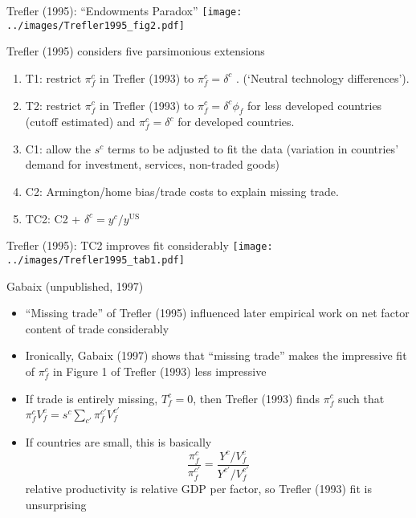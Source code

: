 \documentclass[10pt,notes=hide]{beamer}
\begin{document}
\begin{frame}{Trefler (1995): ``Endowments Paradox''}
\texttt{[image: ../images/Trefler1995\_fig2.pdf]}
\end{frame}
\begin{frame}{}
Trefler (1995) considers five parsimonious extensions
\begin{enumerate}
	\item T1: restrict $\pi_f^c$ in Trefler (1993) to $\pi_f^c = \delta^c$ . (`Neutral technology differences').
	\item T2: restrict $\pi_f^c$ in Trefler (1993) to $\pi_f^c = \delta^c \phi_f$ for less developed countries (cutoff estimated) and $\pi_f^c = \delta^c$ for developed countries.
	\item C1: allow the $s^c$ terms to be adjusted to fit the data (variation in countries' demand for investment, services, non-traded goods)
	\item C2: Armington/home bias/trade costs to explain missing trade.
	\item TC2: C2 + $\delta^c=y^c/y^{\text{US}}$
\end{enumerate}
\end{frame}
\begin{frame}{Trefler (1995): TC2 improves fit considerably}
\texttt{[image: ../images/Trefler1995\_tab1.pdf]}
\end{frame}
\begin{frame}{Gabaix (unpublished, 1997)}
\begin{itemize}
	\item ``Missing trade'' of Trefler (1995) influenced later empirical work on net factor content of trade considerably
	\item Ironically, Gabaix (1997) shows that ``missing trade'' makes the impressive fit of $\pi_f^c$ in Figure 1 of Trefler (1993) less impressive
	\item If trade is entirely missing, $T_f^c=0$, then Trefler (1993) finds $\pi_f^c$ such that $\pi_f^c V_f^c = s^c \sum_{c'} \pi_f^{c'} V_f^{c'}$
	\item If countries are small, this is basically 
	$$ \frac{\pi_f^c}{\pi_f^{c'}} = \frac{Y^c / V_f^c}{Y^{c'} / V_f^{c'}}$$
	relative productivity is relative GDP per factor, so Trefler (1993) fit is unsurprising
\end{itemize}
\end{frame}
\end{document}
